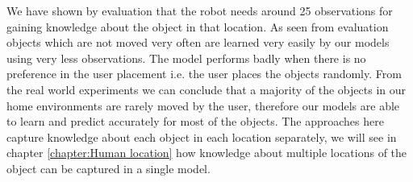 We have shown by evaluation that the robot needs around 25 observations for gaining knowledge about the object in that location. As seen from evaluation objects which are not moved very often are learned very easily by our models using very less observations. The model performs badly when there is no preference in the user placement i.e. the user places the objects randomly. 
From the real world experiments we can conclude that a majority of the objects in our home environments are rarely moved by the user, therefore our models are able to learn and predict accurately for most of the objects. 
The approaches here capture knowledge about each object in each location separately, we will see in chapter \ref{chapter:Human location} how knowledge about multiple locations of the object can be captured in a single model.

